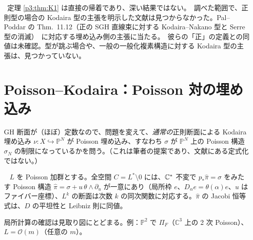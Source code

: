 \begin{rem}[位置づけ]
\tP\ 定理 \ref{p3:thm:K1} は直接の帰着であり、深い結果ではない。\tC\ 調べた範囲で、正則型の場合の Kodaira 型の主張を明示した文献は見つからなかった。Pal--Poddar の Thm.\ 11.12（正の SGH 直線束に対する Kodaira--Nakano 型と Serre 型の消滅）\tC\ に対応する埋め込み側の主張に当たる。\tQ\ 彼らの「正」の定義との同値は未確認。型が跳ぶ場合や、一般の一般化複素構造に対する Kodaira 型の主張は、見つかっていない。
\end{rem}

\section{Poisson--Kodaira：Poisson 対の埋め込み}\label{p3:sec:PK}
GH 断面が（ほぼ）定数なので、問題を変えて、\emph{通常の}正則断面による Kodaira 埋め込み $\nu:X\hookrightarrow\mathbb P^N$ が Poisson 埋め込み、すなわち $\sigma$ が $\mathbb P^N$ 上の Poisson 構造 $\sigma_N$ の制限になっているかを問う。（これは筆者の提案であり、文献にある定式化ではない。）

\begin{lem}\tP\ \tQ\label{p3:lem:lift}
$L$ を Poisson 加群とする。全空間 $C=L^*\setminus 0$ には、$\mathbb C^*$ 不変で $p_*\hat\pi=\sigma$ をみたす Poisson 構造 $\hat\pi=\sigma+u\,\theta\wedge\partial_u$ が一意にあり（局所枠 $e$、$D_\alpha e=\theta(\alpha)e$、$u$ はファイバー座標）、$L^k$ の断面は次数 $k$ の同次関数に対応する。$\hat\pi$ の Jacobi 恒等式は、$D$ の平坦性と Leibniz 則に同値。
\end{lem}
\noindent 局所計算の確認は見取り図にとどまる\tQ。例：$\mathbb P^2$ で $\Pi_F$（$\mathbb C^3$ 上の 2 次 Poisson）、$L=\mathcal O(m)$（任意の $m$）。


